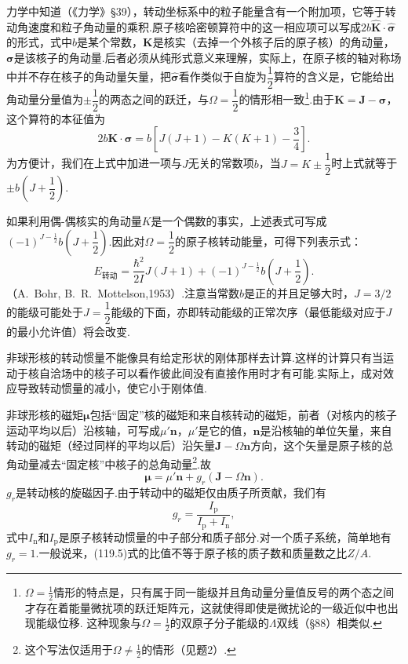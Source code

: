 力学中知道（《力学》§39），转动坐标系中的粒子能量含有一个附加项，它等于转动角速度和粒子角动量的乘积.原子核哈密顿算符中的这一相应项可以写成$2b\hat{\boldsymbol{K}}\cdot\hat{\boldsymbol{\sigma}}$的形式，式中$b$是某个常数，$\boldsymbol{K}$是核实（去掉一个外核子后的原子核）的角动量，$\boldsymbol{\sigma}$是该核子的角动量.后者必须从纯形式意义来理解，实际上，在原子核的轴对称场中并不存在核子的角动量矢量，把$\hat{\boldsymbol{\sigma}}$看作类似于自旋为$\dfrac{1}{2}$算符的含义是，它能给出角动量分量值为$\pm\dfrac{1}{2}$的两态之间的跃迁，与$\Omega=\dfrac{1}{2}$的情形相一致\footnote{$\Omega=\frac{1}{2}$情形的特点是，只有属于同一能级并且角动量分量值反号的两个态之间才存在着能量微扰项的跃迁矩阵元，这就使得即使是微扰论的一级近似中也出现能级位移.
这种现象与$\Omega=\frac{1}{2}$的双原子分子能级的$\Lambda$双线（§88）相类似.}.由于$\boldsymbol{K}=\boldsymbol{J}-\boldsymbol{\sigma}$，这个算符的本征值为
\begin{equation*}
  2b\boldsymbol{K}\cdot\boldsymbol{\sigma}
  =b\left[J(J+1)-K(K+1)-\frac{3}{4}\right].
\end{equation*}
为方便计，我们在上式中加进一项与$J$无关的常数项$b$，当$J=K\pm\dfrac{1}{2}$时上式就等于$\pm b\left(J+\dfrac{1}{2}\right)$.

如果利用偶-偶核实的角动量$K$是一个偶数的事实，上述表式可写成$(-1)^{J-\frac{1}{2}}b\left(J+\dfrac{1}{2}\right)$.因此对$\Omega=\dfrac{1}{2}$的原子核转动能量，可得下列表示式：
\begin{equation}
  E_{\text{转动}}=\frac{\hbar^2}{2I}J(J+1)
  +(-1)^{J-\frac{1}{2}}b\left(J+\frac{1}{2}\right).
\end{equation}
（A.~Bohr, B.~R.~Mottelson,1953）.注意当常数$b$是正的并且足够大时，$J=3/2$的能级可能处于$J=\dfrac{1}{2}$能级的下面，亦即转动能级的正常次序（最低能级对应于$J$的最小允许值）将会改变.

非球形核的转动惯量不能像具有给定形状的刚体那样去计算.这样的计算只有当运动于核自洽场中的核子可以看作彼此间没有直接作用时才有可能.实际上，成对效应导致转动惯量的减小，使它小于刚体值.

非球形核的磁矩$\boldsymbol{\mu}$包括“固定”核的磁矩和来自核转动的磁矩，前者（对核内的核子运动平均以后）沿核轴，可写成$\mu'\boldsymbol{n}$，$\mu'$是它的值，$\boldsymbol{n}$是沿核轴的单位矢量，来自转动的磁矩（经过同样的平均以后）沿矢量$\boldsymbol{J}-\Omega\boldsymbol{n}$方向，这个矢量是原子核的总角动量减去“固定核”中核子的总角动量\footnote{这个写法仅适用于$\Omega\neq\frac{1}{2}$的情形（见题2）.}.故
\begin{equation}
  \boldsymbol{\mu}=\mu'\boldsymbol{n}+g_r\left(\boldsymbol{J}-\Omega\boldsymbol{n}\right).
\end{equation}
$g_r$是转动核的旋磁因子.由于转动中的磁矩仅由质子所贡献，我们有
\begin{equation}
  g_r=\frac{I_\mathrm{p}}{I_\mathrm{p}+I_\mathrm{n}},
\end{equation}
式中$I_\mathrm{n}$和$I_\mathrm{p}$是原子核转动惯量的中子部分和质子部分.对一个质子系统，简单地有$g_r=1$.一般说来，(119.5)式的比值不等于原子核的质子数和质量数之比$Z/A$.

